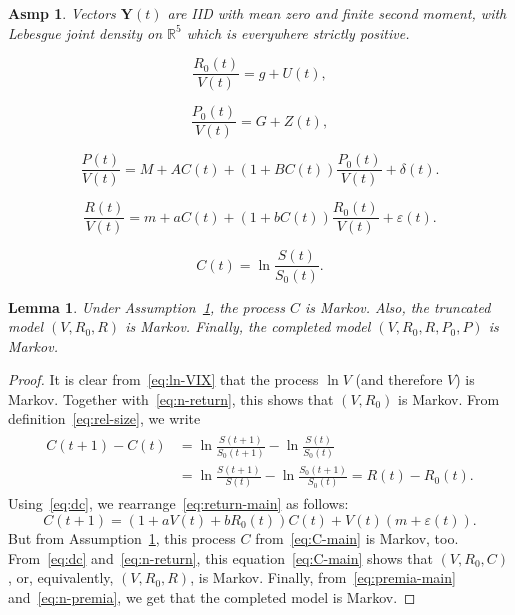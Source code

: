 \documentclass[10pt,a4paper]{amsart}
\newtheorem{asmp}{Asmp}
\newtheorem{lemma}{Lemma}
\begin{document}
\begin{asmp}
Vectors $\mathbf{Y}(t)$ are IID with mean zero and finite second moment, with Lebesgue joint density on $\mathbb R^5$ which is everywhere strictly positive. 
\label{asmp:innovations}
\end{asmp}

\begin{equation}
\label{eq:n-return}
\frac{R_0(t)}{V(t)} = g + U(t),
\end{equation}

\begin{equation}
\label{eq:n-premia}
\frac{P_0(t)}{V(t)} = G + Z(t),
\end{equation}

\begin{equation}
\label{eq:premia-main}
\frac{P(t)}{V(t)} = M + AC(t) + (1 + BC(t))\frac{P_0(t)}{V(t)} + \delta(t).
\end{equation}

\begin{equation}
\label{eq:return-main}
\frac{R(t)}{V(t)} = m + aC(t) + (1 + bC(t))\frac{R_0(t)}{V(t)} + \varepsilon(t).
\end{equation}

\begin{equation}
\label{eq:rel-size}
C(t) = \ln\frac{S(t)}{S_0(t)}.
\end{equation} 

\begin{lemma} Under Assumption~\ref{asmp:innovations}, the process $C$ is Markov. Also, the truncated model $(V, R_0, R)$ is Markov. Finally, the completed model $(V, R_0, R, P_0, P)$ is Markov. 
\end{lemma}

\begin{proof} It is clear from~\eqref{eq:ln-VIX} that the process $\ln V$ (and therefore $V$) is Markov. Together with~\eqref{eq:n-return}, this shows that $(V, R_0)$ is Markov. From definition~\eqref{eq:rel-size}, we write 
\begin{align}
\label{eq:dc}
\begin{split}
C(t+1) - C(t) &= \ln\frac{S(t+1)}{S_0(t+1)} - \ln\frac{S(t)}{S_0(t)} \\ & = \ln\frac{S(t+1)}{S(t)} - \ln\frac{S_0(t+1)}{S_0(t)} = R(t) - R_0(t).
\end{split}
\end{align}
Using~\eqref{eq:dc}, we rearrange~\eqref{eq:return-main} as follows:
\begin{equation}
\label{eq:C-main}
C(t+1) = (1 + aV(t) + bR_0(t))C(t) + V(t)(m + \varepsilon(t)).
\end{equation}
But from Assumption~\ref{asmp:innovations}, this process $C$ from~\eqref{eq:C-main} is Markov, too. From~\eqref{eq:dc} and~\eqref{eq:n-return}, this equation~\eqref{eq:C-main} shows that $(V, R_0, C)$, or, equivalently, $(V, R_0, R)$, is Markov. Finally, from~\eqref{eq:premia-main} and~\eqref{eq:n-premia}, we get that the completed model is Markov. 
\end{proof}
\end{document}
